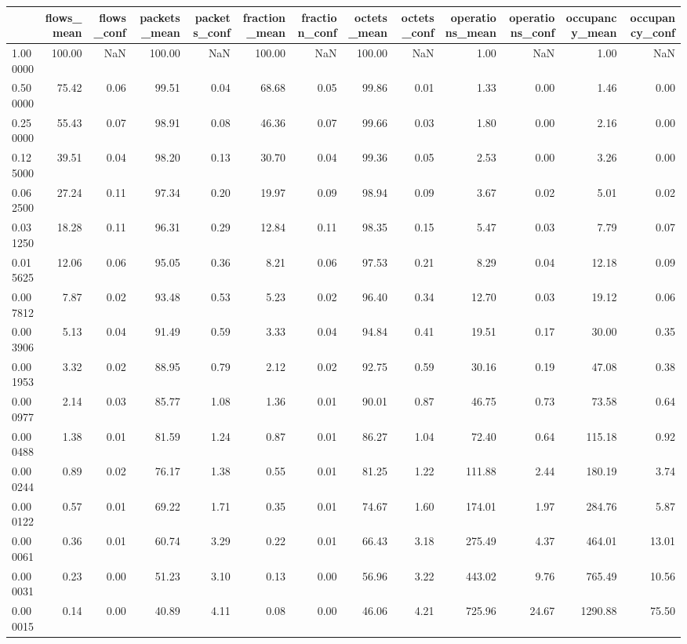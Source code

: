 \begin{tabular}{lrrrrrrrrrrrr}
\toprule
 & flows_mean & flows_conf & packets_mean & packets_conf & fraction_mean & fraction_conf & octets_mean & octets_conf & operations_mean & operations_conf & occupancy_mean & occupancy_conf \\
\midrule
1.000000 & 100.00 & NaN & 100.00 & NaN & 100.00 & NaN & 100.00 & NaN & 1.00 & NaN & 1.00 & NaN \\
0.500000 & 75.42 & 0.06 & 99.51 & 0.04 & 68.68 & 0.05 & 99.86 & 0.01 & 1.33 & 0.00 & 1.46 & 0.00 \\
0.250000 & 55.43 & 0.07 & 98.91 & 0.08 & 46.36 & 0.07 & 99.66 & 0.03 & 1.80 & 0.00 & 2.16 & 0.00 \\
0.125000 & 39.51 & 0.04 & 98.20 & 0.13 & 30.70 & 0.04 & 99.36 & 0.05 & 2.53 & 0.00 & 3.26 & 0.00 \\
0.062500 & 27.24 & 0.11 & 97.34 & 0.20 & 19.97 & 0.09 & 98.94 & 0.09 & 3.67 & 0.02 & 5.01 & 0.02 \\
0.031250 & 18.28 & 0.11 & 96.31 & 0.29 & 12.84 & 0.11 & 98.35 & 0.15 & 5.47 & 0.03 & 7.79 & 0.07 \\
0.015625 & 12.06 & 0.06 & 95.05 & 0.36 & 8.21 & 0.06 & 97.53 & 0.21 & 8.29 & 0.04 & 12.18 & 0.09 \\
0.007812 & 7.87 & 0.02 & 93.48 & 0.53 & 5.23 & 0.02 & 96.40 & 0.34 & 12.70 & 0.03 & 19.12 & 0.06 \\
0.003906 & 5.13 & 0.04 & 91.49 & 0.59 & 3.33 & 0.04 & 94.84 & 0.41 & 19.51 & 0.17 & 30.00 & 0.35 \\
0.001953 & 3.32 & 0.02 & 88.95 & 0.79 & 2.12 & 0.02 & 92.75 & 0.59 & 30.16 & 0.19 & 47.08 & 0.38 \\
0.000977 & 2.14 & 0.03 & 85.77 & 1.08 & 1.36 & 0.01 & 90.01 & 0.87 & 46.75 & 0.73 & 73.58 & 0.64 \\
0.000488 & 1.38 & 0.01 & 81.59 & 1.24 & 0.87 & 0.01 & 86.27 & 1.04 & 72.40 & 0.64 & 115.18 & 0.92 \\
0.000244 & 0.89 & 0.02 & 76.17 & 1.38 & 0.55 & 0.01 & 81.25 & 1.22 & 111.88 & 2.44 & 180.19 & 3.74 \\
0.000122 & 0.57 & 0.01 & 69.22 & 1.71 & 0.35 & 0.01 & 74.67 & 1.60 & 174.01 & 1.97 & 284.76 & 5.87 \\
0.000061 & 0.36 & 0.01 & 60.74 & 3.29 & 0.22 & 0.01 & 66.43 & 3.18 & 275.49 & 4.37 & 464.01 & 13.01 \\
0.000031 & 0.23 & 0.00 & 51.23 & 3.10 & 0.13 & 0.00 & 56.96 & 3.22 & 443.02 & 9.76 & 765.49 & 10.56 \\
0.000015 & 0.14 & 0.00 & 40.89 & 4.11 & 0.08 & 0.00 & 46.06 & 4.21 & 725.96 & 24.67 & 1290.88 & 75.50 \\

\end{tabular}
